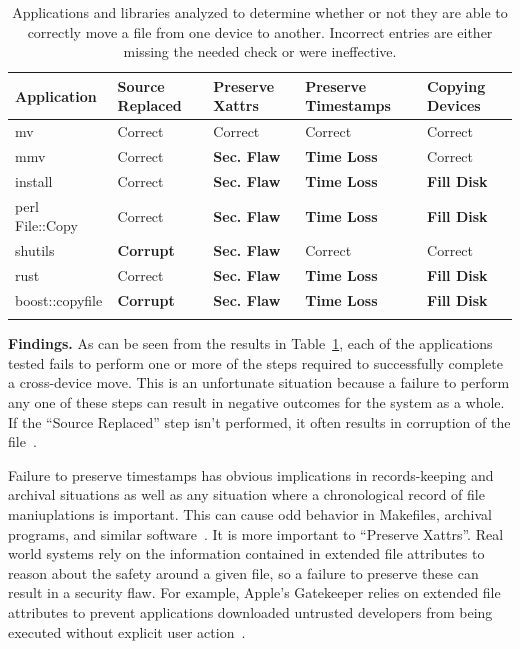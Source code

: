  \begin{table}[t]
    \scriptsize{}
    \begin{tabular}{l p{1cm} p{1cm} p{1.2cm} p{1cm}}
    \toprule{}
        Application     & Source Replaced & Preserve Xattrs & Preserve Timestamps & Copying Devices\\
\hline
        mv              & Correct             & Correct         & Correct             & Correct\\
        mmv             & Correct             & {\bf Sec. Flaw} & {\bf Time
Loss} & Correct\\
        install         & Correct             & {\bf Sec. Flaw} & {\bf Time
Loss} & {\bf Fill Disk} \\
        perl File::Copy & Correct             & {\bf Sec. Flaw} & {\bf Time
Loss} & {\bf Fill Disk} \\
        shutils         & {\bf Corrupt}	& {\bf Sec. Flaw} 	& Correct             & Correct\\
        rust            & Correct             & {\bf Sec. Flaw} & {\bf Time
Loss} & {\bf Fill Disk} \\
        boost::copyfile & {\bf Corrupt}	      & {\bf Sec. Flaw} & {\bf Time
Loss} & {\bf Fill Disk} \\
    \bottomrule{}
    \end{tabular}
    \caption{Applications and libraries analyzed to determine whether or not
      they are able to correctly move a file from one device to another.
Incorrect entries are either missing the needed check or were ineffective.
}
    \label{table:crossdevice}
\end{table}

{\bf Findings.}
As can be seen from the results in Table~\ref{table:crossdevice}, each of the
applications tested fails to perform one or more of the steps required to
successfully complete a cross-device move.  This is an unfortunate situation
because a failure to perform any one of these steps can result in negative
outcomes for the system as a whole.  If the ``Source Replaced'' step isn't
performed, it often results in corruption of the file~\cite{PythonShutilBug}.
%

Failure to preserve timestamps has obvious
implications in records-keeping and archival situations as well as any situation
where a chronological record of file maniuplations is important.  This can 
cause odd behavior in Makefiles, archival programs, and similar
software~\cite{NautilusTimestamps, SudoTimestamp}.
%
It is more important to ``Preserve Xattrs''.  Real world systems rely on the
information contained in extended file attributes to reason about the safety
around a given file, so a failure to preserve these can result in a
security flaw.  For example, Apple's Gatekeeper relies on extended file
attributes to prevent applications downloaded untrusted developers from being
executed without explicit user action~\cite{AppleCodesigning}.



